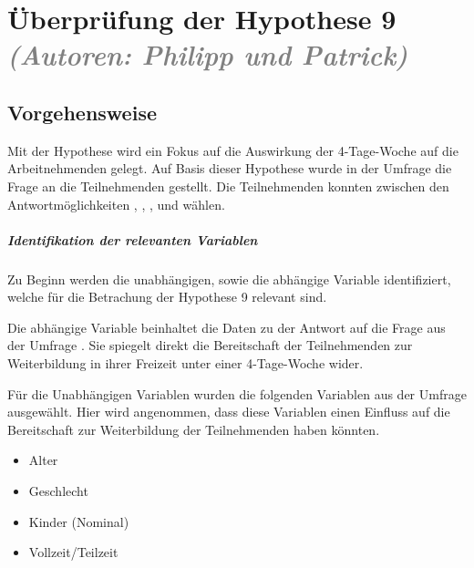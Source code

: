 
\chapter{Überprüfung der Hypothese 9 \textit{\textcolor{gray}{(Autoren: Philipp und Patrick)}}}
\label{chap:hypothese9}

\section{Vorgehensweise}
Mit der Hypothese  wird ein Fokus auf die 
Auswirkung der 4-Tage-Woche auf die Arbeitnehmenden gelegt. Auf Basis dieser Hypothese 
wurde in der Umfrage
die Frage  an die Teilnehmenden gestellt.
Die Teilnehmenden konnten zwischen den Antwortmöglichkeiten , , , 
 und  wählen.

\paragraph*{Identifikation der relevanten Variablen}

Zu Beginn werden die unabhängigen, sowie die abhängige Variable identifiziert, welche für die 
Betrachung der Hypothese 9 relevant sind.

Die abhängige Variable beinhaltet die Daten zu der Antwort auf die Frage aus der Umfrage
.
Sie spiegelt direkt die Bereitschaft der Teilnehmenden zur Weiterbildung in ihrer Freizeit 
unter einer 4-Tage-Woche wider.

Für die Unabhängigen Variablen wurden die folgenden Variablen aus der Umfrage ausgewählt. 
Hier wird angenommen, dass diese Variablen einen Einfluss auf die Bereitschaft zur 
Weiterbildung der Teilnehmenden haben könnten.
\begin{itemize}
    \item Alter
    \item Geschlecht %
    \item Kinder (Nominal)
    \item Vollzeit/Teilzeit
\end{itemize}


